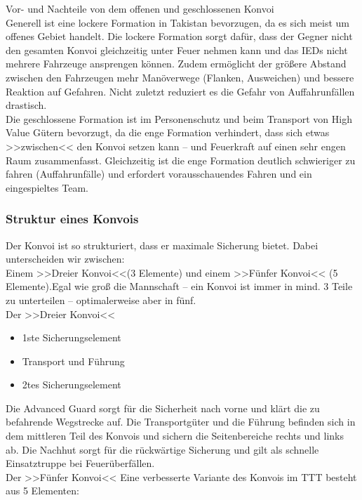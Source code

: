 Vor- und Nachteile von dem offenen und geschlossenen Konvoi \\
	Generell ist eine lockere Formation in Takistan bevorzugen, da es sich meist um offenes Gebiet handelt. Die lockere Formation sorgt dafür, dass der Gegner nicht den gesamten Konvoi gleichzeitig unter Feuer nehmen kann und das IEDs nicht mehrere Fahrzeuge ansprengen können. Zudem ermöglicht der größere Abstand zwischen den Fahrzeugen mehr Manöverwege (Flanken, Ausweichen) und bessere Reaktion auf Gefahren. Nicht zuletzt reduziert es die Gefahr von Auffahrunfällen drastisch.  \\
	Die geschlossene Formation ist im Personenschutz und beim Transport von High Value Gütern bevorzugt, da die enge Formation verhindert, dass sich etwas >>zwischen<< den Konvoi setzen kann – und Feuerkraft auf einen sehr engen Raum zusammenfasst. Gleichzeitig ist die enge Formation deutlich schwieriger zu fahren (Auffahrunfälle) und erfordert vorausschauendes Fahren und ein eingespieltes Team. \\

\subsubsection{Struktur eines Konvois}
	Der Konvoi ist so strukturiert, dass er maximale Sicherung bietet. Dabei unterscheiden wir zwischen: \\
	Einem >>Dreier Konvoi<<(3 Elemente) und einem >>Fünfer Konvoi<< (5 Elemente).Egal wie groß die Mannschaft – ein Konvoi ist immer in mind. 3 Teile zu unterteilen – optimalerweise aber in fünf.  \\
Der >>Dreier Konvoi<<

	\begin{itemize}
		\item 1ste Sicherungselement
		\item Transport und Führung
		\item 2tes Sicherungselement
	\end{itemize}

	Die  Advanced Guard sorgt für die Sicherheit nach vorne und klärt die zu befahrende Wegstrecke auf. Die Transportgüter und die Führung befinden sich in dem mittleren Teil des Konvois und sichern die Seitenbereiche rechts und links ab. Die Nachhut sorgt für die rückwärtige Sicherung und gilt als schnelle Einsatztruppe bei Feuerüberfällen. \\
Der >>Fünfer Konvoi<<
Eine verbesserte Variante des Konvois im TTT besteht aus 5 Elementen:

